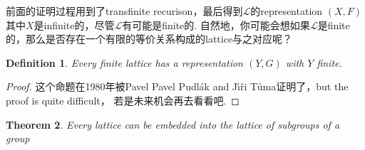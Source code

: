 \documentclass{article}
\newtheorem{theorem}{Theorem}[section]
\newtheorem{definition}[theorem]{Definition}
\newcommand\lattice{\mathcal{L}}
\begin{document}
{\color{red} 前面的证明过程用到了transfinite recurison，最后得到$\lattice$的representation $(X,F)$其中$X$是infinite的，尽管$\lattice$有可能是finite的. 自然地，你可能会想如果$\lattice$是finite的，那么是否存在一个有限的等价关系构成的lattice与之对应呢？} 

\begin{definition}
\rm Every finite lattice has a representation $(Y,G)$ with $Y$ finite.
\end{definition}

\begin{proof}
这个命题在1980年被Pavel Pavel Pudlák and Jı́ři Tůma证明了，but the proof is quite difficult，{\color{blue} 若是未来机会再去看看吧}.
\end{proof}

\begin{theorem}
\rm Every lattice can be embedded into the lattice of subgroups of a group
\end{theorem}
\end{document}
